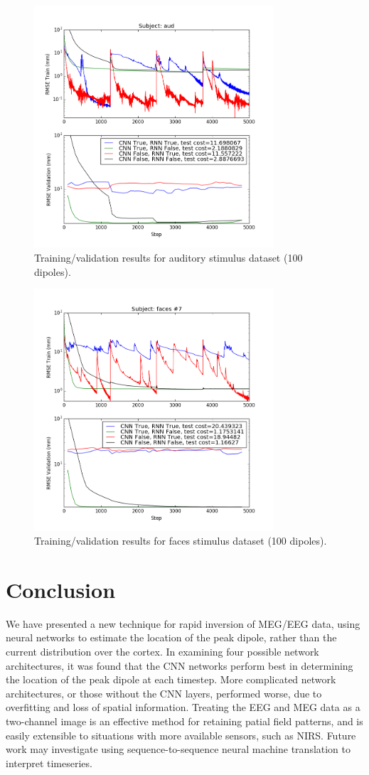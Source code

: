 \documentclass[journal]{IEEEtran}
\begin{document}
\begin{figure}[!t]
\centering
\includegraphics[width=3.5in]{aud100}
\caption{Training/validation results for auditory stimulus dataset (100 dipoles).}
\label{fig:aud100}
\end{figure}

\begin{figure}[!t]
\centering
\includegraphics[width=3.5in]{faces100}
\caption{Training/validation results for faces stimulus dataset (100 dipoles).}
\label{fig:faces100}
\end{figure}

\section{Conclusion}
We have presented a new technique for rapid inversion of MEG/EEG data, using neural networks to estimate the location of the peak dipole, rather than the current distribution over the cortex. In examining four possible network architectures, it was found that the CNN networks perform best in determining the location of the peak dipole at each timestep. More complicated network architectures, or those without the CNN layers, performed worse, due to overfitting and loss of spatial information. Treating the EEG and MEG data as a two-channel image is an effective method for retaining patial field patterns, and is easily extensible to situations with more available sensors, such as NIRS. Future work may investigate using sequence-to-sequence neural machine translation to interpret timeseries.
\end{document}
